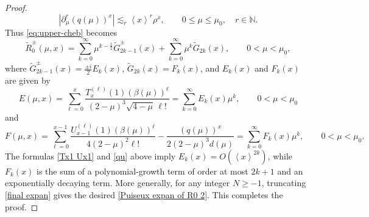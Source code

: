 \documentclass[10pt,a4paper]{amsart}
\newcommand\N{\mathbb{N}}
\numberwithin{equation}{section}
\begin{document}
\begin{proof}
\begin{equation}
\left|\partial_\mu^r (q(\mu))^x\right|
\lesssim_r \left<x\right>^r\rho^x,
\qquad 0\leq\mu\leq\mu_0,\quad r\in\N.
\end{equation}
Thus \eqref{eq:upper-cheb} becomes
\begin{equation}\label{final expan}
\widetilde R_0^\pm(\mu,x)
=
\sum_{k=0}^{\infty}
\mu^{k-\frac12}\widetilde G_{2k-1}^\pm(x)
+
\sum_{k=0}^{\infty}
\mu^k\widetilde G_{2k}(x),\qquad0<\mu<\mu_0, 
\end{equation} 
where $\widetilde G_{2k-1}^\pm(x)=\frac{\pm i}{2}E_k(x)$, $\widetilde G_{2k}(x)=F_k(x)$, and $E_k(x)$ and $F_k(x)$ are given by
\begin{equation*}
E(\mu,x)=\sum_{\ell=0}^{x}
\frac{T_x^{(\ell)}(1)(\beta(\mu))^\ell}
{(2-\mu)^3\sqrt{4-\mu}\,\ell!}=\sum_{k=0}^\infty E_k(x)\mu^k,\qquad0<\mu<\mu_0
\end{equation*}
and 
\begin{equation*}
F(\mu,x)=\sum_{\ell=0}^{x-1}
\frac{U_{x-1}^{(\ell)}(1)(\beta(\mu))^\ell}
{4(2-\mu)^2\ell!}
-\frac{(q(\mu))^x}{2(2-\mu)^3d(\mu)}=\sum\limits_{k=0}^{\infty}F_k(x)\mu^k,\qquad0<\mu<\mu_0.
\end{equation*}
The formulas \eqref{Tx1 Ux1} and \eqref{qu} above imply
$
E_k(x)=O(\left< x\right>^{2k})$,
while $F_k(x)$ is the sum of a polynomial-growth term of order at most
$2k+1$ and an exponentially decaying term. More generally, for any integer $N\geq-1$, truncating
\eqref{final expan} gives the desired \eqref{Puiseux expan of R0 2}. This completes the proof.
\end{proof}
\end{document}
